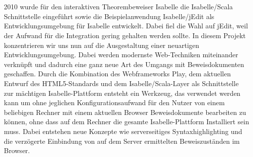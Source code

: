 \section*{\abstractname}

2010 wurde für den interaktiven Theorembeweiser Isabelle die Isabelle/Scala Schnittstelle eingeführt
sowie die Beispielanwendung Isabelle/jEdit als Entwicklungsumgebung für Isabelle entwickelt. Dabei
fiel die Wahl auf jEdit, weil der Aufwand für die Integration gering gehalten werden sollte. In
diesem Projekt konzentrieren wir uns nun auf die Ausgestaltung einer neuartigen
Entwicklungsumgebung. Dabei werden modernste Web-Techniken miteinander verknüpft und dadurch eine
ganz neue Art des Umgangs mit Beweisdokumenten geschaffen. Durch die Kombination des Webframeworks
Play, dem aktuellen Entwurf des HTML5-Standards und dem Isabelle/Scala-Layer als Schnittstelle zur
mächtigen Isabelle-Plattform entsteht ein Werkzeug, das verwendet werden kann um ohne jeglichen
Konfigurationsaufwand für den Nutzer von einem beliebigen Rechner mit einem aktuellen Browser
Beweisdokumente bearbeiten zu können, ohne dass auf dem Rechner die gesamte Isabelle-Plattform
Installiert sein muss. Dabei entstehen neue Konzepte wie serverseitiges Syntaxhighlighting und die
verzögerte Einbindung von auf dem Server ermittelten Beweiszuständen im Browser.